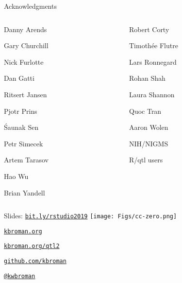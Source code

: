 \documentclass[12pt,t,aspectratio=169]{beamer}
\begin{document}
\begin{frame}[c]{Acknowledgments}

\begin{columns}[T]
  \begin{column}[T]{0.5\textwidth}
    \vspace{0pt}
\bi
\item[] Danny Arends
\item[] Gary Churchill
\item[] Nick Furlotte
\item[] Dan Gatti
\item[] Ritsert Jansen
\item[] Pjotr Prins
\item[] \'Saunak Sen
\item[] Petr Simecek
\item[] Artem Tarasov
\item[] Hao Wu
\item[] Brian Yandell
  \ei
  \end{column} \hfill
\begin{column}[T]{0.5\textwidth}
\vspace*{0mm}

  \bi
\item[] Robert Corty
\item[] Timoth\'ee Flutre
\item[] Lars Ronnegard
\item[] Rohan Shah
\item[] Laura Shannon
\item[] Quoc Tran
\item[] Aaron Wolen
\item[]
\item[] NIH/NIGMS
\item[]
\item[] {\hilit R/qtl users}
  \ei
\end{column}
\end{columns}

\end{frame}


\begin{frame}[c]{}

\Large

Slides: \href{https://bit.ly/rstudio2019}{\tt bit.ly/rstudio2019} \quad
\texttt{[image: Figs/cc-zero.png]}

\vspace{7mm}

\href{https://kbroman.org}{\tt \lolit kbroman.org}

\vspace{7mm}

\href{https://kbroman.org/qtl2}{\tt kbroman.org/qtl2}

\vspace{7mm}

\href{https://github.com/kbroman}{\tt \lolit github.com/kbroman}

\vspace{7mm}

\href{https://twitter.com/kwbroman}{\tt \lolit @kwbroman}


\end{frame}
\end{document}
